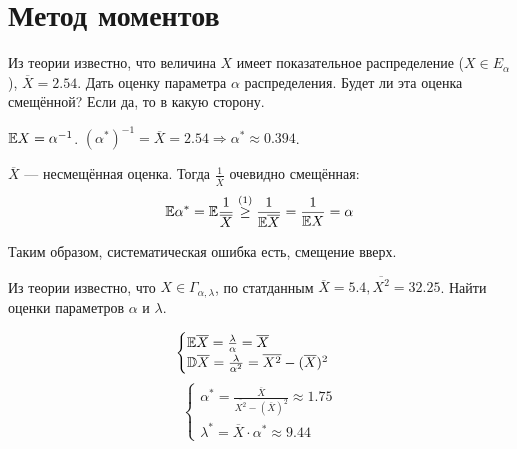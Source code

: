 

\cfoot{}



\section*{Метод моментов}

\begin{exercise}
    Из теории известно, что величина \(X\) имеет показательное распределение (\(X \in E_\alpha\)), \(\overline{X} = 2.54\). Дать оценку параметра \(\alpha\) распределения. Будет ли эта оценка смещённой? Если да, то в какую сторону.
\end{exercise}
\begin{solution}
    \(\mathbb{E} X = \alpha^{ -1}\). \((\alpha^*)^{ - 1} = \overline{X} = 2.54 \Rightarrow \alpha^* \approx 0.394\).

    \(\overline{X}\) --- несмещённая оценка. Тогда \(\frac{1}{\overline{X}}\) очевидно смещённая:
    \[\E \alpha^* = \E \frac{1}{\overline{X}} \symref{йенсена}{\geq} \frac{1}{\E \overline{X}} = \frac{1}{\E X} = \alpha\]

    Таким образом, систематическая ошибка есть, смещение вверх.
\end{solution}

\begin{exercise}
    Из теории известно, что \(X \in \Gamma_{\alpha, \lambda}\), по статданным \(\overline{X} = 5.4, \overline{X^2} = 32.25\). Найти оценки параметров \(\alpha\) и \(\lambda\).
\end{exercise}
\begin{solution}
    \[\begin{cases}
            \mathbb{E} \overline{X} = \frac{\lambda}{\alpha} = \overline{X} \\
            \mathbb{D} \overline{X} = \frac{\lambda}{\alpha^2} = \overline{X^2} - (\overline{X})^2
        \end{cases}\]
    \[\begin{cases}
            \alpha^* = \frac{\overline{X}}{\overline{X^2} - (\overline{X})^2} \approx 1.75 \\
            \lambda^* = \overline{X} \cdot \alpha^* \approx 9.44
        \end{cases}\]
\end{solution}


